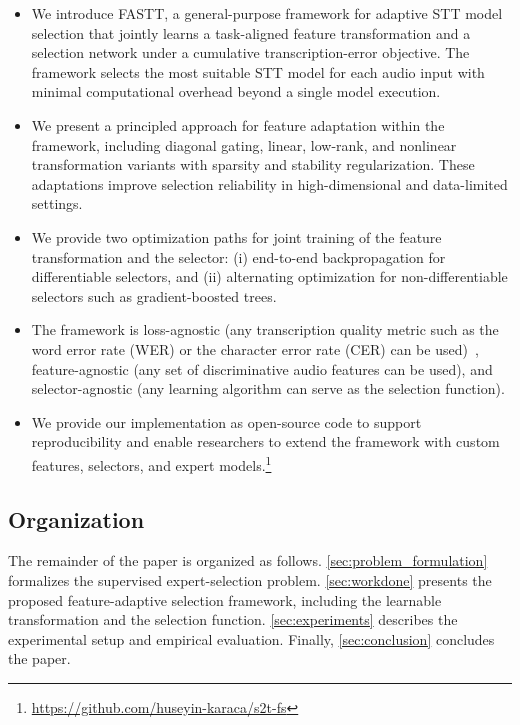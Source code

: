 \documentclass[journal]{IEEEtran}
\begin{document}
    \begin{itemize}
        \item We introduce FASTT, a general-purpose framework for adaptive STT
            model selection that jointly learns a task-aligned feature
            transformation and a selection network under a cumulative
            transcription-error objective. The framework selects the most suitable
            STT model for each audio input with minimal computational overhead beyond
            a single model execution.

        \item We present a principled approach for feature adaptation within the
            framework, including diagonal gating, linear, low-rank, and nonlinear
            transformation variants with sparsity and stability regularization.
            These adaptations improve selection reliability in high-dimensional
            and data-limited settings.

        \item We provide two optimization paths for joint training of the feature
            transformation and the selector: (i) end-to-end backpropagation for
            differentiable selectors, and (ii) alternating optimization for non-differentiable selectors
            such as gradient-boosted trees.

        \item The framework is loss-agnostic (any transcription quality metric
            such as the word error rate (WER) or the character error rate (CER) can be used)~\cite{li2014overviewrobust}, feature-agnostic (any set of discriminative
            audio features can be used), and selector-agnostic (any learning
            algorithm can serve as the selection function).

        \item We provide our implementation as open-source code to support reproducibility
            and enable researchers to extend the framework with custom features,
            selectors, and expert models.\footnote{\url{https://github.com/huseyin-karaca/s2t-fs}}
    \end{itemize}

    \subsection{Organization}

    The remainder of the paper is organized as follows. \cref{sec:problem_formulation}
    formalizes the supervised expert-selection problem. \cref{sec:workdone}
    presents the proposed feature-adaptive selection framework, including the learnable
    transformation and the selection function. \cref{sec:experiments} describes
    the experimental setup and empirical evaluation. Finally,
    \cref{sec:conclusion} concludes the paper.
\end{document}
